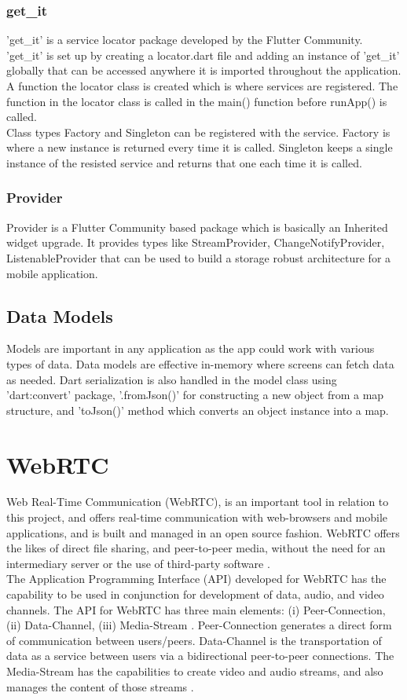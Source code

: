 \subsubsection{get\_it}
'get\_it' is a service locator package developed by the Flutter Community. 'get\_it' is set up by creating a locator.dart file and adding an instance of 'get\_it' globally that can be accessed anywhere it is imported throughout the application. A function the locator class is created which is where services are registered. The function in the locator class is called in the main() function before runApp() is called.
\\ Class types Factory and Singleton can be registered with the service. Factory is where a new instance is returned every time it is called. Singleton keeps a single instance of the resisted service and returns that one each time it is called.

\subsubsection{Provider}
Provider is a Flutter Community based package which is basically an Inherited widget upgrade. It provides types like StreamProvider, ChangeNotifyProvider, ListenableProvider that can be used to build a storage robust architecture for a mobile application.

\subsection{Data Models}
Models are important in any application as the app could work with various types of data. Data models are effective in-memory where screens can fetch data as needed. Dart serialization is also handled in the model class using 'dart:convert' package, '.fromJson()' for constructing a new object from a map structure, and 'toJson()' method which converts an object instance into a map.

\section{WebRTC}
\label{webRTCTR}
Web Real-Time Communication (WebRTC), is an important tool in relation to this project, and offers real-time communication with web-browsers and mobile applications, and is built and managed in an open source fashion. WebRTC offers the likes of direct file sharing, and peer-to-peer media, without the need for an intermediary server or the use of third-party software \cite{johnston2012webrtc}. 
\\The Application Programming Interface (API) developed for WebRTC has the capability to be used in conjunction for development of data, audio, and video channels. The API for WebRTC has three main elements: (i) Peer-Connection, (ii) Data-Channel, (iii) Media-Stream \cite{jesup2015webrtc}. Peer-Connection generates a direct form of communication between users/peers. Data-Channel is the transportation of data as a service between users via a bidirectional peer-to-peer connections. The Media-Stream has the capabilities  to create video and audio streams, and also manages the content of those streams \cite{14003034520191201}.

